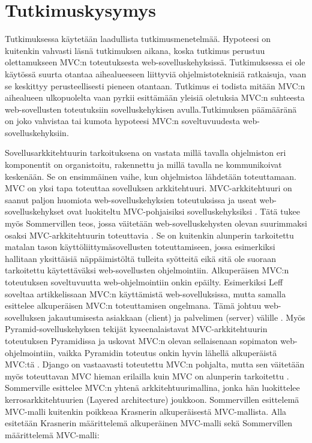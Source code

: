 \documentclass[utf8]{gradu3}
\begin{document}
\section{Tutkimuskysymys}
Tutkimuksessa käytetään laadullista tutkimusmenetelmää. Hypoteesi on kuitenkin vahvasti läsnä tutkimuksen aikana, koska tutkimus perustuu olettamukseen MVC:n toteutuksesta web-sovelluskehyksissä. Tutkimuksessa ei ole
käytössä suurta otantaa aihealueeseen liittyviä ohjelmistoteknisiä ratkaisuja, vaan se keskittyy perusteellisesti pieneen otantaan. Tutkimus ei todista mitään MVC:n aihealueen ulkopuolelta vaan pyrkii esittämään yleisiä oletuksia 
MVC:n suhteesta web-sovellusten toteutuksiin sovelluskehykisen avulla.Tutkimuksen päämääränä on joko vahvistaa tai kumota hypoteesi MVC:n soveltuvuudesta web-sovelluskehyksiin. 

Sovellusarkkitehtuurin tarkoituksena on vastata millä tavalla ohjelmiston eri komponentit on organistoitu, rakennettu ja millä tavalla ne kommunikoivat keskenään. Se on ensimmäinen vaihe, kun ohjelmistoa lähdetään toteuttamaan. MVC on yksi tapa
toteuttaa sovelluksen arkkitehtuuri.    \parencite[s. 148]{Sommerville} MVC-arkkitehtuuri on saanut paljon huomiota web-sovelluskehyksien
toteutuksissa ja useat web-sovelluskehykset ovat luokiteltu
MVC-pohjaisiksi sovelluskehyksiksi \parencite{mvcframeworks}. Tätä tukee myös Sommervillen teos, jossa väitetään web-sovelluskehysten olevan suurimmaksi osaksi MVC-arkkitehtuurin toteuttavia \parencite[s. 432]{Sommerville}.
Se on kuitenkin alunperin tarkoitettu matalan tason käyttöliittymäsovellusten toteuttamiseen,
jossa esimerkiksi hallitaan yksittäisiä näppäimistöltä tulleita
syötteitä eikä sitä ole suoraan tarkoitettu käytettäväksi
web-sovellusten ohjelmointiin. Alkuperäisen MVC:n toteutuksen
soveltuvuutta web-ohjelmointiin onkin epäilty. Esimerkiksi Leff
soveltaa artikkelissaan MVC:n käyttämistä web-sovelluksissa, mutta
samalla esittelee alkuperäisen MVC:n toteuttamisen ongelmana. Tämä johtuu web-sovelluksen jakautumisesta asiakkaan
(client) ja palvelimen (server) välille \parencite{ibm_watson}. Myös Pyramid-sovelluskehyksen tekijät
kyseenalaistavat MVC-arkkitehtuurin toteutuksen Pyramidissa ja uskovat
MVC:n olevan sellaisenaan sopimaton web-ohjelmointiin, vaikka
Pyramidin toteutus onkin hyvin lähellä alkuperäistä MVC:tä
\parencite{pyramid}. Django on vastaavasti toteutettu MVC:n pohjalta, mutta sen väitetään
myös toteuttavan MVC hieman erilailla kuin MVC on alunperin tarkoitettu \parencite{django_mvc}.
Sommerville \parencite[s. 157]{Sommerville} esittelee MVC:n yhtenä arkkitehtuurimallina, jonka hän luokittelee
 kerrosarkkitehtuurien (Layered architecture) joukkoon. Sommervillen esittelemä  MVC-malli kuitenkin poikkeaa Krasnerin \parencite{krasner} alkuperäisestä MVC-mallista. Alla esitetään Krasnerin määrittelemä alkuperäinen MVC-malli sekä Sommervillen määrittelemä MVC-malli:
\end{document}
